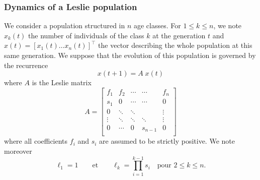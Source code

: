 \subsubsection{Dynamics of a Leslie population}


We consider a population structured in $n$ age classes. For $1 \leq k \leq n$, we note $x_k(t)$ the number of individuals of the class $k$ at the generation $t$ and $x(t) = [x_1(t) \dots x_n(t)]^\top$ the vector describing the whole population at this same generation. We suppose that the evolution of this population is governed by the recurrence
\begin{equation} \label{eq:recurrenceLeslie}
  x(t+1) = A \; x(t)
\end{equation}
where $A$ is the Leslie matrix
$$
A = \left[\begin{array}{cccccc}
            f_1 & f_2 & \cdots  & \cdots & f_n \\
            s_1 & 0 & \cdots  & \cdots & 0 \\
            0 & \ddots  & \ddots & & \vdots \\
            \vdots & \ddots & \ddots & \ddots & \vdots \\
            0 & \cdots & 0 & s_{n-1} & 0 \\
          \end{array}\right]
$$
where all coefficients $f_i$ and $s_i$ are assumed to be strictly positive. We note moreover
$$
\ell_1 = 1 \qquad \text{et} \qquad 
\ell_k = \prod_{i=1}^{k-1} s_i \quad \text{pour $2 \leq k \leq n$}.
$$
